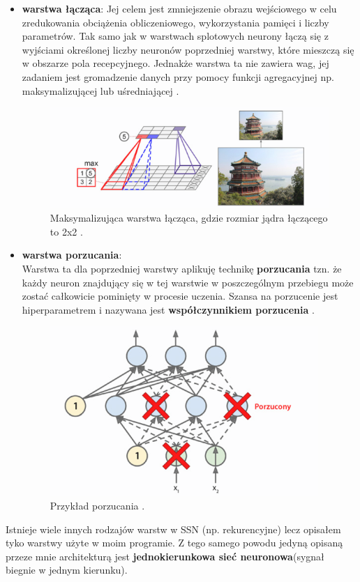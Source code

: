 \documentclass{article}
\begin{document}
\begin{itemize}
\item \textbf{warstwa łącząca}:
Jej celem jest zmniejszenie obrazu wejściowego w celu zredukowania obciążenia obliczeniowego,
wykorzystania pamięci i liczby parametrów. Tak samo jak w warstwach splotowych neurony 
łączą się z wyjściami określonej liczby neuronów poprzedniej warstwy, które mieszczą się w
obszarze pola recepcyjnego. Jednakże warstwa ta nie zawiera wag, jej zadaniem jest gromadzenie
danych przy pomocy funkcji agregacyjnej np. maksymalizującej lub uśredniającej \cite{um}.

\begin{figure}[H]
\centering
\includegraphics[scale=0.6]{pool.png}
\caption{Maksymalizująca warstwa łącząca, gdzie rozmiar jądra łączącego to 2x2 \cite{um}.}
\end{figure}

\item \textbf{warstwa porzucania}:\\
Warstwa ta dla poprzedniej warstwy aplikuję technikę \textbf{porzucania} tzn. że
każdy neuron znajdujący się w tej warstwie w poszczególnym przebiegu może zostać całkowicie
pominięty w procesie uczenia. Szansa na porzucenie jest hiperparametrem i nazywana jest 
\textbf{współczynnikiem porzucenia} \cite{um}.

\begin{figure}[H]
\centering
\includegraphics[scale=0.6]{dropout.png}
\caption{Przykład porzucania \cite{um}.}
\end{figure}

\end{itemize}
Istnieje wiele innych rodzajów warstw w SSN (np. rekurencyjne) lecz opisałem tyko warstwy
użyte w moim programie. Z tego samego powodu jedyną opisaną przeze mnie architekturą jest
\textbf{jednokierunkowa sieć neuronowa}(sygnał biegnie w jednym kierunku).
\end{document}

